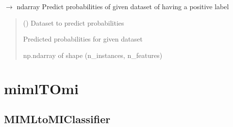 \documentclass[letterpaper,10pt,english]{sphinxmanual}
\begin{document}
\begin{fulllineitems}
\begin{fulllineitems}
\label{\detokenize{classifier/mimlTOml/_autosummary/miml.classifier.mimlTOml.miml_to_ml_classifier.MIMLtoMLClassifier:miml.classifier.mimlTOml.miml_to_ml_classifier.MIMLtoMLClassifier.predict_proba}}
\pysigstartsignatures
\pysiglinewithargsret
{}
{}
{{ $\rightarrow$ ndarray}}
\pysigstopsignatures
\sphinxAtStartPar
Predict probabilities of given dataset of having a positive label
\begin{quote}\begin{description}
\sphinxAtStartPar
{} ({\hyperref[\detokenize{data/_autosummary/miml.data.miml_dataset.MIMLDataset:miml.data.miml_dataset.MIMLDataset}]{}}) \textendash{} Dataset to predict probabilities

\sphinxAtStartPar
{} \textendash{} Predicted probabilities for given dataset

\sphinxAtStartPar
np.ndarray of shape (n\_instances, n\_features)

\end{description}\end{quote}

\end{fulllineitems}


\end{fulllineitems}


\sphinxstepscope


\section{mimlTOmi}
\label{\detokenize{classifier/mimlTOmi/index:mimltomi}}\label{\detokenize{classifier/mimlTOmi/index::doc}}
\sphinxstepscope


\subsection{MIMLtoMIClassifier}
\label{\detokenize{classifier/mimlTOmi/miml_to_mi_classifier:mimltomiclassifier}}\label{\detokenize{classifier/mimlTOmi/miml_to_mi_classifier::doc}}
\end{document}
